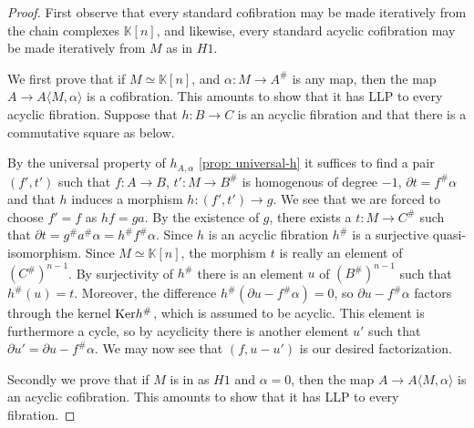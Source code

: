 \documentclass[../thesis.tex]{subfiles}
\begin{document}
            \begin{proof}
                First observe that every standard cofibration may be made iteratively from the chain complexes $\mathbb{K}[n]$, and likewise, every standard acyclic cofibration may be made iteratively from $M$ as in $H1$.

                We first prove that if $M \simeq \mathbb{K}[n]$, and $\alpha : M \rightarrow A^\#$ is any map, then the map $A \rightarrow A\langle M,\alpha\rangle$ is a cofibration. This amounts to show that it has LLP to every acyclic fibration. Suppose that $h: B \rightarrow C$ is an acyclic fibration and that there is a commutative square as below.
                \begin{center}
                \end{center}
                
                By the universal property of $h_{A,\alpha}$ \ref{prop: universal-h} it suffices to find a pair $(f',t')$ such that $f: A \rightarrow B$, $t' : M \rightarrow B^\#$ is homogenous of degree $-1$, $\partial t = f^\#\alpha$ and that $h$ induces a morphism $h : (f',t') \rightarrow g$. We see that we are forced to choose $f' = f$ as $hf = ga$. By the existence of $g$, there exists a $t : M \rightarrow C^\#$ such that $\partial t = g^\#a^\#\alpha = h^\#f^\#\alpha$. Since $h$ is an acyclic fibration $h^\#$ is a surjective quasi-isomorphism. Since $M \simeq \mathbb{K}[n]$, the morphism $t$ is really an element of $(C^{\#})^{n-1}$. By surjectivity of $h^\#$ there is an element $u$ of $(B^{\#})^{n-1}$ such that $h^\#(u) = t$. Moreover, the difference $h^\#(\partial u - f^\#\alpha) = 0$, so $\partial u - f^\#\alpha$ factors through the kernel $\tt{Ker} h^\#$, which is assumed to be acyclic. This element is furthermore a cycle, so by acyclicity there is another element $u'$ such that $\partial u' = \partial u - f^\#\alpha$. We may now see that $(f, u - u')$ is our desired factorization.
                
                Secondly we prove that if $M$ is in as $H1$ and $\alpha = 0$, then the map $A \rightarrow A\langle M,\alpha\rangle$ is an acyclic cofibration. This amounts to show that it has LLP to every fibration.
                

\end{proof}
\end{document}
